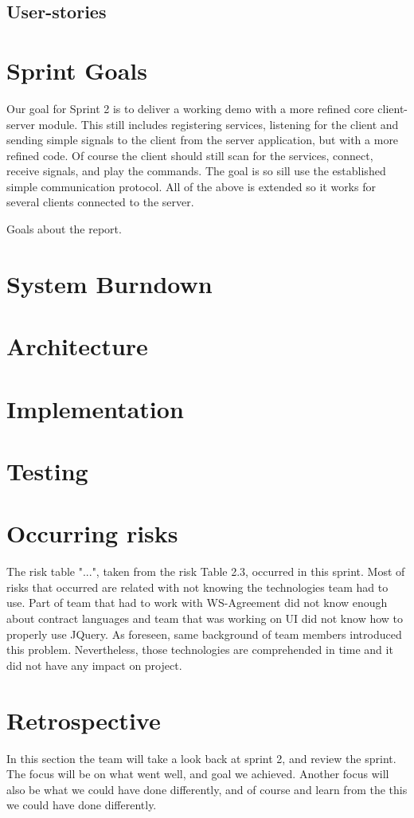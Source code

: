\subsection{User-stories}

\section{Sprint Goals}
Our goal for Sprint 2 is to deliver a working demo with a more refined core client-server module. 
This still includes registering services, listening for the client and sending simple signals to the client from the server application, but with a more refined code. Of course the client should still scan for the services, connect, receive signals, and play the commands. The goal is so sill use the established simple communication protocol. All of the above is extended so it works for several clients connected to the server.

Goals about the report.

\section{System Burndown}
\section{Architecture}
\section{Implementation}
\section{Testing}
\section{Occurring risks}
The risk table "...", taken from the risk Table 2.3, occurred in this sprint. Most of risks 
that occurred are related with not knowing the technologies team had to use. Part of team that had to work with WS-Agreement did not know enough about contract languages and team that was working on UI did not know how to properly use JQuery. 
As foreseen, same background of team members introduced this problem. Nevertheless, those technologies are comprehended in time and it did not have any impact on project.
\section{Retrospective}
In this section the team will take a look back at sprint 2, and review the sprint. The focus will be on what went well, and goal we achieved. Another focus will also be what we could have done differently, and of course and learn from the this we could have done differently.

